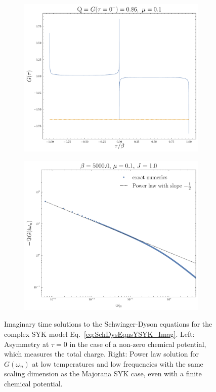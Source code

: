 \begin{figure}
    \centering
    \begin{subfigure}[t]{0.45\linewidth}
        \centering
        \includegraphics[width=\linewidth]{figures/introduction/Gtaushowingspectasymm.pdf}
    \end{subfigure}
    \begin{subfigure}[t]{0.45\linewidth}
        \centering
        \includegraphics[width=\linewidth]{figures/introduction/complexSYKpowerlaw.pdf}
    \end{subfigure}
    \caption{Imaginary time solutions to the Schwinger-Dyson equations for the complex SYK model Eq.~\eqref{eq:SchDysEqnsYSYK_Imag}. Left: Asymmetry at $\tau=0$ in the case of a non-zero chemical potential, which measures the total charge. Right: Power law solution for $G(\omega_n)$ at low temperatures and low frequencies with the same scaling dimension as the Majorana SYK case, even with a finite chemical potential.}
    \label{fig:CSYKsolns}
\end{figure}



